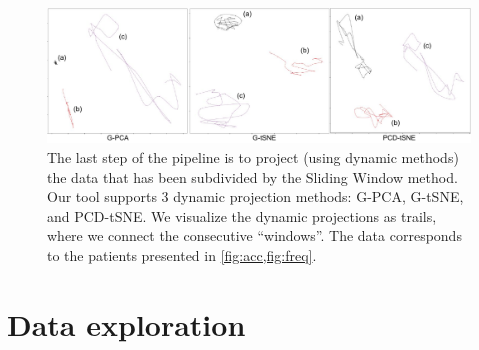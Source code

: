 \begin{figure}[ht]
\centering
\includegraphics[width=\linewidth]{figures/nemo/nemo1-projections.pdf}
\caption{The last step of the pipeline is to project (using dynamic methods) the data that has been subdivided by the Sliding Window method. Our tool supports 3 dynamic projection methods: G-PCA, G-tSNE, and PCD-tSNE. We visualize the dynamic projections as trails, where we connect the consecutive ``windows''. The data corresponds to the patients presented in \cref{fig:acc,fig:freq}.}
\label{fig:nemo1-projections}
\end{figure}


\section{Data exploration}


